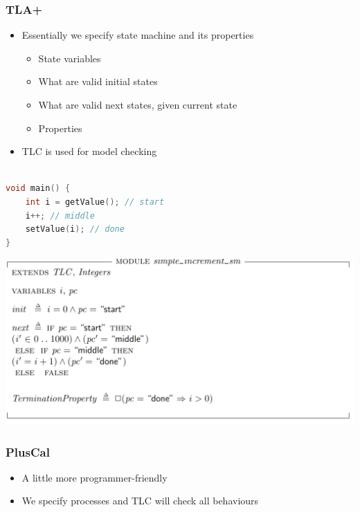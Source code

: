 \documentclass{beamer}
\begin{document}
\begin{frame}
    \frametitle{TLA+}
    \begin{itemize}
        \item Essentially we specify state machine and its properties 
        \begin{itemize}
            \item State variables
            \item What are valid initial states 
            \item What are valid next states, given current state 
            \item Properties
        \end{itemize}
        \item TLC is used for model checking 
    \end{itemize}
\end{frame}

\begin{frame}[fragile]
	\begin{lstlisting}[language=C++]

void main() {
    int i = getValue(); // start
    i++; // middle
    setValue(i); // done
}

	\end{lstlisting}
	
\end{frame}

\begin{frame}[fragile]
    \includegraphics[width=\textwidth]{./sm_increment.png}
\end{frame}

\begin{frame}
    \frametitle{PlusCal}
    \begin{itemize}
        \item A little more programmer-friendly 
        \item We specify processes and TLC will check all behaviours
    \end{itemize}
\end{frame}
\end{document}
